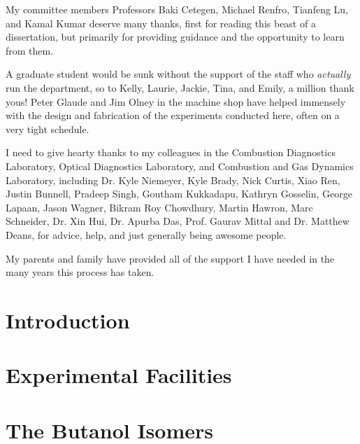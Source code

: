 \documentclass[12pt,letterpaper,oneside,final]{book}
\begin{document}
My committee members Professors Baki Cetegen, Michael Renfro, Tianfeng
Lu, and Kamal Kumar deserve many thanks, first for reading this beast of
a dissertation, but primarily for providing guidance and the opportunity
to learn from them.

A graduate student would be sunk without the support of the staff who
\textit{actually} run the department, so to Kelly, Laurie, Jackie, Tina,
and Emily, a million thank yous! Peter Glaude and Jim Olney in the machine
shop have helped immensely with the design and fabrication of the experiments
conducted here, often on a very tight schedule.

I need to give hearty thanks to my colleagues in the Combustion Diagnostics
Laboratory, Optical Diagnostics Laboratory, and Combustion and Gas
Dynamics Laboratory, including Dr. Kyle Niemeyer, Kyle Brady, Nick Curtis, Xiao Ren, Justin
Bunnell, Pradeep Singh, Goutham Kukkadapu, Kathryn Gosselin, George Lapaan,
Jason Wagner, Bikram Roy Chowdhury, Martin Hawron, Marc Schneider, Dr. Xin Hui,
Dr. Apurba Das, Prof. Gaurav Mittal and Dr. Matthew Deans, for advice,
help, and just generally being awesome people.

My parents and family have provided all of the support I have needed in
the many years this process has taken.

\cleardoublepage
{}
\tableofcontents

\cleardoublepage
{}
\listoffigures

\cleardoublepage
{}
\listoftables

\cleardoublepage
\setcounter{page}{1}

\chapter{Introduction}
\label{chap:intro}

\cleardoublepage

\chapter{Experimental Facilities}
\label{chap:facilities}

\cleardoublepage

\chapter{The Butanol Isomers}
\label{chap:buoh}

\cleardoublepage
\end{document}
